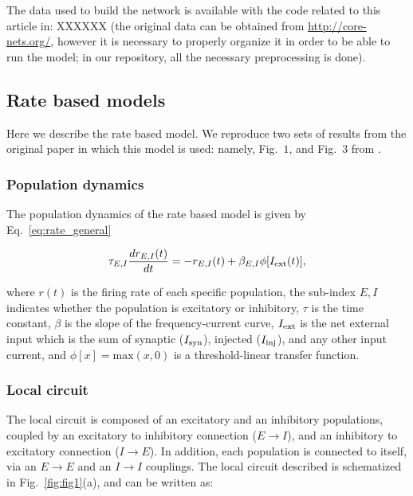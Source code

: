 The data used to build the network is available with the code related to this article in: XXXXXX (the original data can be obtained from
\href{core-nets.org/}{http://core-nets.org/}, however it is necessary to properly organize it in order to be able to run the model; in our repository, all the necessary preprocessing is done).

\subsection{Rate based models}\label{rate_model}

Here we describe the rate based model. We reproduce two sets of results from the original paper in which this model is used: namely, Fig.~$1$, and Fig.~$3$ from \cite{joglekar2018inter}.

\subsubsection{Population dynamics}\label{rate_pop}

The population dynamics of the rate based model is given by Eq.~\ref{eq:rate_general}

\begin{equation}
    \tau_{E,I}\frac{dr_{E,I}(t)}{dt} = -r_{E,I}(t) + \beta_{E,I}\phi[I_{\rm ext}(t)],
    \label{eq:rate_general}
\end{equation}

\noindent where $r(t)$ is the firing rate of each specific population, the sub-index $E,I$ indicates whether the population is excitatory or inhibitory, $\tau$ is the time constant, $\beta$ is the slope of the frequency-current curve, $I_{\rm ext}$ is the net external input which is the sum of synaptic ($I_{\rm syn}$), injected ($I_{\rm inj}$), and any other input current, and $\phi[x] = \text{max}(x,0)$ is a threshold-linear transfer function.

\subsubsection{Local circuit}\label{local_rate}

The local circuit is composed of an excitatory and an inhibitory populations, coupled by an excitatory to inhibitory connection ($E\rightarrow I$), and an inhibitory to excitatory connection ($I\rightarrow E$). In addition, each population is connected to itself, via an $E\rightarrow E$ and an $I\rightarrow I$ couplings. The local circuit described is schematized in Fig.~\ref{fig:fig1}(a), and can be written as:


